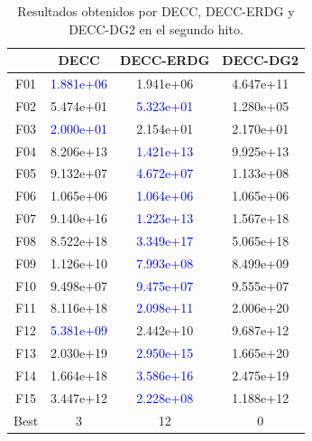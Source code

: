 \begin{table}[h]
\centering
\begin{tabular}{cccc}
\toprule
{} &       DECC &  DECC-ERDG &   DECC-DG2 \\
\midrule
F01  &  \textcolor{blue}{1.881e+06} &  1.941e+06 &  4.647e+11 \\
F02  &  5.474e+01 &  \textcolor{blue}{5.323e+01} &  1.280e+05 \\
F03  &  \textcolor{blue}{2.000e+01} &  2.154e+01 &  2.170e+01 \\
F04  &  8.206e+13 &  \textcolor{blue}{1.421e+13} &  9.925e+13 \\
F05  &  9.132e+07 &  \textcolor{blue}{4.672e+07} &  1.133e+08 \\
F06  &  1.065e+06 &  \textcolor{blue}{1.064e+06} &  1.065e+06 \\
F07  &  9.140e+16 &  \textcolor{blue}{1.223e+13} &  1.567e+18 \\
F08  &  8.522e+18 &  \textcolor{blue}{3.349e+17} &  5.065e+18 \\
F09  &  1.126e+10 &  \textcolor{blue}{7.993e+08} &  8.499e+09 \\
F10  &  9.498e+07 &  \textcolor{blue}{9.475e+07} &  9.555e+07 \\
F11  &  8.116e+18 &  \textcolor{blue}{2.098e+11} &  2.006e+20 \\
F12  &  \textcolor{blue}{5.381e+09} &  2.442e+10 &  9.687e+12 \\
F13  &  2.030e+19 &  \textcolor{blue}{2.950e+15} &  1.665e+20 \\
F14  &  1.664e+18 &  \textcolor{blue}{3.586e+16} &  2.475e+19 \\
F15  &  3.447e+12 &  \textcolor{blue}{2.228e+08} &  1.188e+12 \\
Best &          3 &         12 &          0 \\
\bottomrule
\end{tabular}
\caption{Resultados obtenidos por DECC, DECC-ERDG y DECC-DG2 en el segundo hito.}
\label{tab:resultados_DECC_2}
\end{table}

